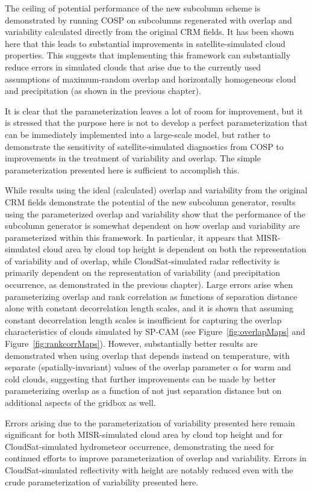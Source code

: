 The ceiling of potential performance of the new subcolumn scheme is
demonstrated by running COSP on subcolumns regenerated with overlap and
variability calculated directly from the original CRM fields. It has
been shown here that this leads to substantial improvements in
satellite-simulated cloud properties. This suggests that implementing
this framework can substantially reduce errors in simulated clouds that
arise due to the currently used assumptions of maximum-random overlap
and horizontally homogeneous cloud and precipitation (as shown in the
previous chapter).

It is clear that the parameterization leaves a lot of room for
improvement, but it is stressed that the purpose here is not to develop
a perfect parameterization that can be immediately implemented into a
large-scale model, but rather to demonstrate the sensitivity of
satellite-simulated diagnostics from COSP to improvements in the
treatment of variability and overlap. The simple parameterization
presented here is sufficient to accomplish this.

While results using the ideal (calculated) overlap and variability from
the original CRM fields demonstrate the potential of the new subcolumn
generator, results using the parameterized overlap and variability show
that the performance of the subcolumn generator is somewhat dependent on
how overlap and variability are parameterized within this framework. In
particular, it appears that MISR-simulated cloud area by cloud top
height is dependent on both the representation of variability and of
overlap, while CloudSat-simulated radar reflectivity is primarily
dependent on the representation of variability (and precipitation
occurrence, as demonstrated in the previous chapter). Large errors arise
when parameterizing overlap and rank correlation as functions of
separation distance alone with constant decorrelation length scales, and
it is shown that assuming constant decorrelation length scales is
insufficient for capturing the overlap characteristics of clouds
simulated by SP-CAM (see Figure~\ref{fig:overlapMaps} and
Figure~\ref{fig:rankcorrMaps}). However, substantially better results
are demonstrated when using overlap that depends instead on temperature,
with separate (spatially-invariant) values of the overlap parameter
\(\alpha\) for warm and cold clouds, suggesting that further
improvements can be made by better parameterizing overlap as a function
of not just separation distance but on additional aspects of the gridbox
as well.

Errors arising due to the parameterization of variability presented here
remain significant for both MISR-simulated cloud area by cloud top
height and for CloudSat-simulated hydrometeor occurrence, demonstrating
the need for continued efforts to improve parameterization of overlap
and variability. Errors in CloudSat-simulated reflectivity with height
are notably reduced even with the crude parameterization of variability
presented here.

